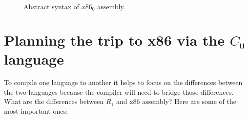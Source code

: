 \documentclass[11pt]{book}
\begin{document}
\begin{figure}[tp]
\caption{Abstract syntax of $x86_0$ assembly.}
\label{fig:x86-ast-a}
\end{figure}

\section{Planning the trip to x86 via the $C_0$ language}
\label{sec:plan-s0-x86}

To compile one language to another it helps to focus on the
differences between the two languages because the compiler will need
to bridge those differences. What are the differences between $R_1$
and x86 assembly? Here are some of the most important ones:
\end{document}
